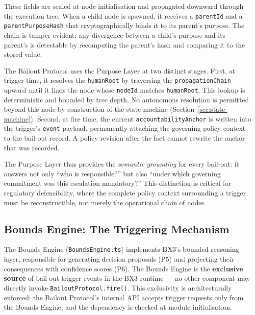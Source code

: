 These fields are sealed at node initialisation and propagated downward through
the execution tree.  When a child node is spawned, it receives a \texttt{parentId}
and a \texttt{parentPurposeHash} that cryptographically binds it to its parent's
purpose.  The chain is tamper-evident: any divergence between a child's purpose
and its parent's is detectable by recomputing the parent's hash and comparing it
to the stored value.

The Bailout Protocol uses the Purpose Layer at two distinct stages.  First, at
trigger time, it resolves the \texttt{humanRoot} by traversing the
\texttt{propagationChain} upward until it finds the node whose \texttt{nodeId}
matches \texttt{humanRoot}.  This lookup is deterministic and bounded by tree
depth.  No autonomous resolution is permitted beyond this node by construction
of the state machine (Section~\ref{sec:state-machine}).  Second, at fire time,
the current \texttt{accountabilityAnchor} is written into the trigger's
\texttt{event} payload, permanently attaching the governing policy context to
the bail-out record.  A policy revision after the fact cannot rewrite the anchor
that was recorded.

The Purpose Layer thus provides the \emph{semantic grounding} for every
bail-out: it answers not only ``who is responsible?'' but also ``under which
governing commitment was this escalation mandatory?''  This distinction is
critical for regulatory defensibility, where the complete policy context
surrounding a trigger must be reconstructible, not merely the operational chain
of nodes.

\subsection{Bounds Engine: The Triggering Mechanism}

The Bounds Engine (\texttt{BoundsEngine.ts}) implements BX3's bounded-reasoning
layer, responsible for generating decision proposals (P5) and projecting their
consequences with confidence scores (P6).  The Bounds Engine is the
\textbf{exclusive source} of bail-out trigger events in the BX3 runtime ---
no other component may directly invoke \texttt{BailoutProtocol.fire()}.  This
exclusivity is architecturally enforced: the Bailout Protocol's internal API
accepts trigger requests only from the Bounds Engine, and the dependency is
checked at module initialisation.

